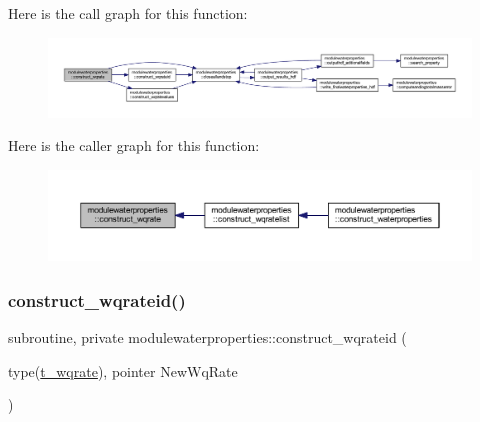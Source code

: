 Here is the call graph for this function\+:\nopagebreak
\begin{figure}[H]
\begin{center}
\leavevmode
\includegraphics[width=350pt]{namespacemodulewaterproperties_a8f1edb788021e4c68656d11b8b90ea26_cgraph}
\end{center}
\end{figure}
Here is the caller graph for this function\+:\nopagebreak
\begin{figure}[H]
\begin{center}
\leavevmode
\includegraphics[width=350pt]{namespacemodulewaterproperties_a8f1edb788021e4c68656d11b8b90ea26_icgraph}
\end{center}
\end{figure}
\mbox{\label{namespacemodulewaterproperties_ab6c7c187dc0a1da19d043a98bcdde9ec}} 
\subsubsection{\texorpdfstring{construct\+\_\+wqrateid()}{construct\_wqrateid()}}
{\footnotesize\ttfamily subroutine, private modulewaterproperties\+::construct\+\_\+wqrateid (\begin{DoxyParamCaption}\item[{type(\mbox{\hyperlink{structmodulewaterproperties_1_1t__wqrate}{t\+\_\+wqrate}}), pointer}]{New\+Wq\+Rate }\end{DoxyParamCaption})\hspace{0.3cm}{\ttfamily [private]}}

